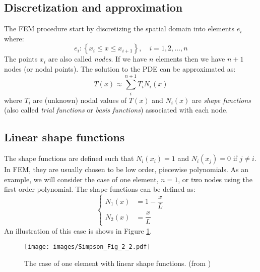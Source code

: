 \documentclass[a4paper,12pt]{article} %
\begin{document}
\subsection{Discretization and approximation}

The FEM procedure start by discretizing the spatial domain into elements $e_{i}$
where:
\begin{equation}
e_{i}: \left\{ x_{i} \leq x \leq x_{i+1} \right\},\quad i=1,2,\ldots,n
\end{equation}
The points $x_{i}$ are also called \textit{nodes}. If we have $n$ elements then we
have $n+1$ nodes (or nodal points).
The solution to the PDE can be approximated as:
\begin{equation}
T(x) \approx \sum_{i}^{n+1} T_{i} N_{i}(x)
\label{eq:sol_pde_approx}
\end{equation}
where $T_i$ are (unknown) nodal values of $T(x)$ and $N_{i}(x)$ are \textit{shape functions}
(also called \textit{trial functions} or \textit{basis functions}) associated with each node.


\subsection{Linear shape functions}
The shape functions are defined such that $N_{i}(x_{i}) = 1$ and $N_{i}(x_{j})=0$
if $j \neq i$. In FEM, they are usually chosen to be low order, piecewise polynomials.
As an example, we will consider the case of one element, $n=1$, or two nodes using
the first order polynomial. The shape functions can be defined as:
\begin{equation}
\begin{cases}
N_{1}(x) & = 1 - \dfrac{x}{L} \\[10pt]
N_{2}(x) & = \dfrac{x}{L}
\end{cases}
\label{eq:linear_shape_functions}
\end{equation}
An illustration of this case is shows in Figure \ref{fig:Simpson_2_2}.

\begin{figure}[H]
{\centering
\texttt{[image: images/Simpson\_Fig\_2\_2.pdf]}
\par}
\caption{The case of one element with linear shape functions. (from \cite{Simpson2017})}
\label{fig:Simpson_2_2}
\end{figure}
\end{document}
